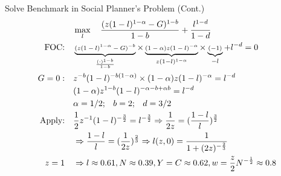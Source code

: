 \documentclass[11pt,aspectratio=43]{beamer}
\theoremstyle{definition}
\begin{document}
\begin{frame}{Solve Benchmark in Social Planner's Problem (Cont.)}
\label{slide:Solve_Benchmark_in_Social_Planner_s_Problem__Cont__}
\begin{align}
        & \max_{l} \quad \frac{(z ( 1-l )^{1-\alpha} - G)^{1-b}}{1-b} + \frac{l^{1-d}}{1-d}
    \\
    \text{FOC:} \quad
        & \scriptsize
            \underbrace{( z ( 1-l )^{1-\alpha} - G )^{-b}}_{ \frac{( \cdot )^{1-b}}{1-b}}
            \times \underbrace{( 1-\alpha )z( 1-l )^{-\alpha}}_{ z( 1-l )^{1-\alpha}}
            \times \underbrace{( -1 )}_{-l}
            + l^{-d} = 0
    \\
    G = 0 : \quad
        & \scriptsize
            z^{-b}( 1-l )^{-b(1-\alpha)} \times ( 1-\alpha ) z( 1-l )^{-\alpha} = l^{-d}
    \\
        & \scriptsize
            ( 1-\alpha ) z^{1-b} ( 1-l )^{-\alpha - b+ \alpha b} = l^{-d}
    \\
        & \scriptsize
            \alpha = 1/2; \quad b = 2; \quad d = 3/2
    \\
    \text{Apply:} \quad
        & \scriptsize
            \frac{1}{2} z^{-1} ( 1-l )^{-\frac{3}{2}} = l^{-\frac{3}{2}} \Rightarrow  \frac{1}{2z} = ( \frac{1-l}{l} )^{ \frac{3}{2}}
    \\
        & \scriptsize
            \Rightarrow \frac{1-l}{l} = ( \frac{1}{2z} )^{\frac{2}{3}} \Rightarrow l( z, 0 ) = \frac{1}{1 + (2z)^{-\frac{2}{3}}}
    \\
    z = 1 \quad
        & \scriptsize
            \Rightarrow l \approx 0.61, N \approx 0.39, Y = C \approx 0.62, w = \frac{z}{2} N^{-\frac{1}{2}} \approx 0.8
\end{align}
\end{frame}
\end{document}
